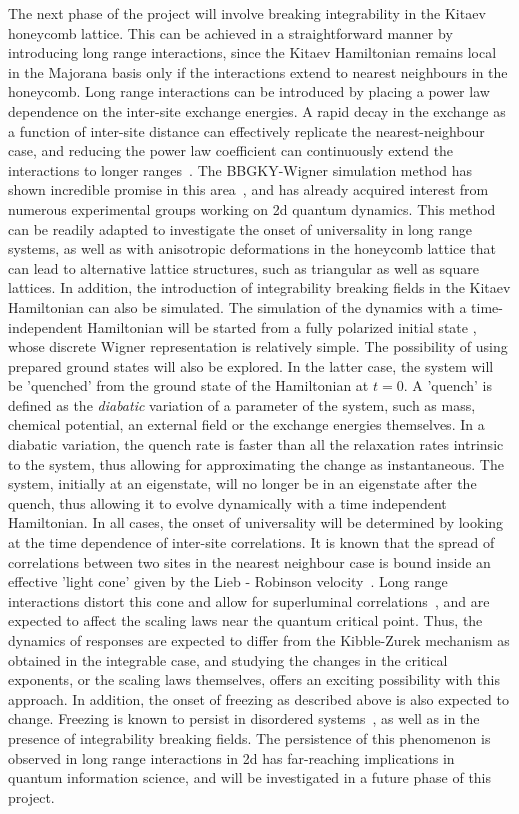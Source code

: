 \documentclass[a4paper,11pt,color]{article}
\begin{document}
The next phase of the project will involve breaking integrability in the Kitaev honeycomb lattice. This can be achieved in a straightforward manner by introducing long range interactions, since the Kitaev Hamiltonian remains local in the Majorana basis only if the interactions extend to nearest neighbours in the honeycomb. Long range interactions can be introduced by placing a power law dependence on the inter-site exchange energies. A rapid decay in the exchange as a function of inter-site distance can effectively replicate the nearest-neighbour case, and reducing the power law coefficient can continuously extend the interactions to longer ranges~\cite{bollinger}. The BBGKY-Wigner simulation method has shown incredible promise in this area~\cite{bbgky}, and has already acquired interest from numerous experimental groups working on 2d quantum dynamics. This method can be readily adapted to investigate the onset of universality in long range systems, as well as with anisotropic deformations in the honeycomb lattice that can lead to alternative lattice structures, such as triangular as well as square lattices. In addition, the introduction of integrability breaking fields in the Kitaev Hamiltonian can also be simulated. The simulation of the dynamics  with a time-independent Hamiltonian will be started from a fully polarized initial state , whose discrete Wigner representation is relatively simple. The possibility of using prepared ground states will also be explored. In the latter case, the system will be 'quenched' from the ground state of the Hamiltonian at $t=0$. A 'quench' is defined as the \textit{diabatic} variation of a {parameter} of the system, such as  mass, chemical potential, an external field or the exchange energies themselves. In a diabatic variation, the quench rate is faster than all the relaxation rates intrinsic to the system, thus allowing for approximating the change as instantaneous. The system, initially at an eigenstate, will no longer be in an eigenstate after the quench, thus allowing it to evolve dynamically with a time independent Hamiltonian. In all cases, the onset of universality will be determined by looking at the time dependence of inter-site correlations. It is known that the spread of correlations between two sites in the nearest neighbour case is bound inside an effective 'light cone' given by the Lieb - Robinson velocity~\cite{lr}. Long range interactions distort this cone and allow for superluminal correlations~\cite{michael}, and are expected to affect the scaling laws near the quantum critical point. Thus, the dynamics of responses are expected to differ from the Kibble-Zurek mechanism as obtained in the integrable case, and studying the changes in the critical exponents, or the scaling laws themselves, offers an exciting possibility with this approach. In addition, the onset of freezing as described above is also expected to change. Freezing is known to persist in disordered systems~\cite{freezing}, as well as in the presence of integrability breaking fields. The persistence of this phenomenon is observed in long range interactions in 2d has far-reaching implications in quantum information science, and will be investigated in a future phase of this project.
\end{document}
